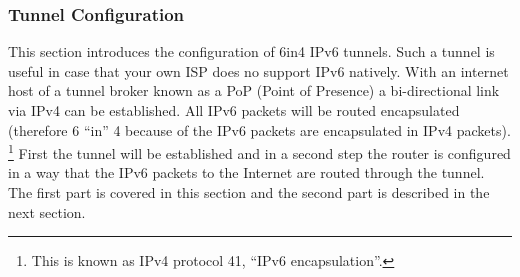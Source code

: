 \subsubsection{Tunnel Configuration}

This section introduces the configuration of 6in4 IPv6 tunnels. Such a 
tunnel is useful in case that your own ISP does no support IPv6 natively. 
With an internet host of a tunnel broker known as a PoP (Point of Presence)
a bi-directional link via IPv4 can be established. All IPv6 packets will 
be routed encapsulated (therefore 6 ``in'' 4 because of the IPv6 packets 
are encapsulated in IPv4 packets). \footnote {This is known as IPv4 protocol 41,
 ``IPv6 encapsulation''.} First the tunnel will be established and in a second 
step the router is configured in a way that the IPv6 packets to the Internet 
are routed through the tunnel. The first part is covered in this section and 
the second part is described in the next section.

